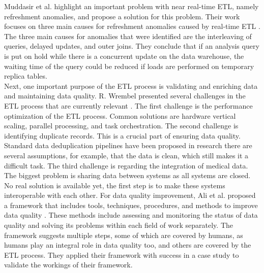 \documentclass[11pt]{article}
\begin{document}
Muddasir et al. highlight an important problem with near real-time ETL, namely refreshment anomalies, and propose a solution for this problem. Their work focuses on three main causes for refreshment anomalies caused by real-time ETL \cite{MohammedMuddasir2020545}. The three main causes for anomalies that were identified are the interleaving of queries, delayed updates, and outer joins. They conclude that if an analysis query is put on hold while there is a concurrent update on the data warehouse, the waiting time of the query could be reduced if loads are performed on temporary replica tables. \\

Next, one important purpose of the ETL process is validating and enriching data and maintaining data quality. R. Wrembel presented several challenges in the ETL process that are currently relevant \cite{Wrembel20223}. The first challenge is the performance optimization of the ETL process. Common solutions are hardware vertical scaling, parallel processing, and task orchestration. The second challenge is identifying duplicate records. This is a crucial part of ensuring data quality. Standard data deduplication pipelines have been proposed in research there are several assumptions, for example, that the data is clean, which still makes it a difficult task. The third challenge is regarding the integration of medical data. The biggest problem is sharing data between systems as all systems are closed. No real solution is available yet, the first step is to make these systems interoperable with each other. For data quality improvement, Ali et al. proposed a framework that includes tools, techniques, procedures, and methods to improve data quality \cite{Ali2020}. These methods include assessing and monitoring the status of data quality and solving its problems within each field of work separately. The framework suggests multiple steps, some of which are covered by humans, as humans play an integral role in data quality too, and others are covered by the ETL process. They applied their framework with success in a case study to validate the workings of their framework. \\
\end{document}
